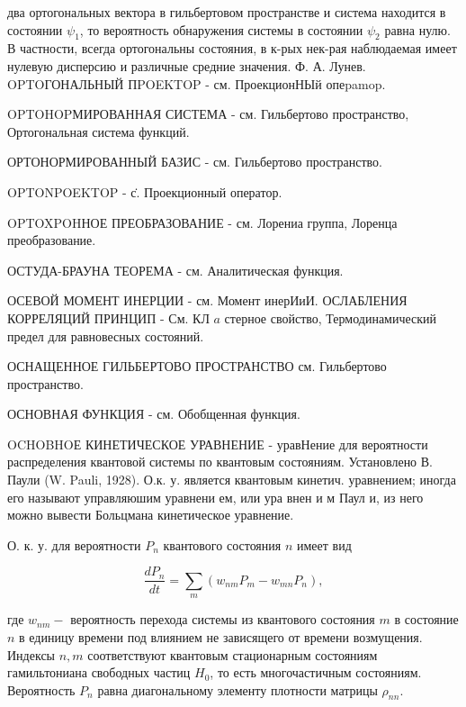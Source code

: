 \documentclass[10pt]{article}
\begin{document}
два ортогональных вектора в гильбертовом пространстве и система находится в состоянии $\psi_{1}$, то вероятность обнаружения системы в состоянии $\psi_{2}$ равна нулю. В частности, всегда ортогональны состояния, в к-рых нек-рая наблюдаемая имеет нулевую дисперсию и различные средние значения. Ф. А. Лунев. OPTOГОНАЛЬНЫЙ ПPOEKTOP - см. ПроекционНЫй опеpamop.



OPTOHOPМИРОВАННАЯ СИСТЕМА - см. Гильбертово пространство, Ортогональная система функций.



ОРТОНОРМИРОВАННЫЙ БАЗИС - см. Гильбертово пространство.



OPTONPOEKTOP - с̇. Проекционный оператор.



OPTOXPOHНОЕ ПРЕОБРАЗОВАНИЕ - см. Лорениа группа, Лоренца преобразование.



ОСТУДА-БРАУНА ТЕОРЕМА - см. Аналитическая функция.



ОСЕВОЙ МОМЕНТ ИНЕРЦИИ - см. Момент инерИиИ. ОСЛАБЛЕНИЯ КОРРЕЛЯЦИЙ ПРИНЦИП - См. КЛ $a$ стерное свойство, Термодинамический предел для равновесных состояний.



ОСНАЩЕННОЕ ГИЛЬБЕРТОВО ПРОСТРАНСТВО см. Гильбертово пространство.



ОСНОВНАЯ ФУНКЦИЯ - см. Обобщенная функция.



OCHOBHOЕ КИНЕТИЧЕСКОЕ УРАВНЕНИЕ - уравНение для вероятности распределения квантовой системы по квантовым состояниям. Установлено В. Паули (W. Pauli, 1928). О.к. у. является квантовым кинетич. уравнением; иногда его называют управляюшим уравнени ем, или ура внен и м Паул и, из него можно вывести Больцмана кинетическое уравнение.



О. к. у. для вероятности $P_{n}$ квантового состояния $n$ имеет вид



\[

\frac{d P_{n}}{d t}=\sum_{m}\left(w_{n m} P_{m}-w_{m n} P_{n}\right),

\]



где $w_{n m}-$ вероятность перехода системы из квантового состояния $m$ в состояние $n$ в единицу времени под влиянием не зависящего от времени возмущения. Индексы $n, m$ соответствуют квантовым стационарным состояниям гамильтониана свободных частиц $H_{0}$, то есть многочастичным состояниям. Вероятность $P_{n}$ равна диагональному элементу плотности матрицы $\rho_{n n}$.
\end{document}
